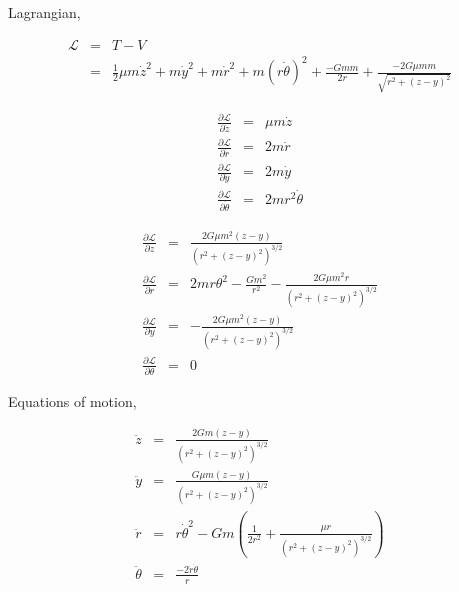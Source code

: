 \documentclass{article}
\begin{document}
Lagrangian,

\begin{eqnarray}
\mathcal{L} & = & T - V \\
& = & \frac{1}{2} \mu m \dot{z}^2 + m \dot{y}^2 + m \dot{r}^2 + m(r\dot{\theta})^2 + \frac{-Gmm}{2r} +  \frac{-2G\mu mm}{\sqrt{r^2 + (z-y)^2}}
\label{eq:potentials}
\end{eqnarray}

\begin{eqnarray}
\frac{\partial{\mathcal{L}}}{\partial{ \dot{z}}} & = & \mu m \dot{z} \\
\frac{\partial{\mathcal{L}}}{\partial{ \dot{r}}} & = & 2m\dot{r} \\
\frac{\partial{\mathcal{L}}}{\partial{ \dot{y}}} & = & 2m\dot{y} \\
\frac{\partial{\mathcal{L}}}{\partial{ \dot{\theta}}} & = & 2mr^2\dot{\theta} 
\end{eqnarray}

\begin{eqnarray}
\frac{\partial{\mathcal{L}}}{\partial{z}} & = & \frac{2G \mu m^2 (z-y)}{(r^2 + (z-y)^2)^{3/2}} \\
\frac{\partial{\mathcal{L}}}{\partial{r}} & = & 2mr\theta^2 - \frac{G m^2}{r^2} - \frac{2 G \mu m^2 r}{(r^2 + (z-y)^2)^{3/2}} \\
\frac{\partial{\mathcal{L}}}{\partial{y}} & = & - \frac{2G \mu m^2 (z-y)}{(r^2 + (z-y)^2)^{3/2}} \\
\frac{\partial{\mathcal{L}}}{\partial{\theta}} & = & 0 
\end{eqnarray}

Equations of motion,

\begin{eqnarray}
\ddot{z} & = & \frac{2G m (z-y)}{(r^2 + (z-y)^2)^{3/2}} \\
\ddot{y} & = & \frac{G \mu m (z-y)}{(r^2 + (z-y)^2)^{3/2}} \\
\ddot{r} & = & r\dot{\theta}^2 - Gm (\frac{1}{2r^2} + \frac{\mu r}{(r^2 + (z-y)^2)^{3/2}}) \\
\ddot{\theta} & = & \frac{-2 \dot{r} \dot{\theta}}{r} 
\label{eq:mot}
\end{eqnarray}
\end{document}
